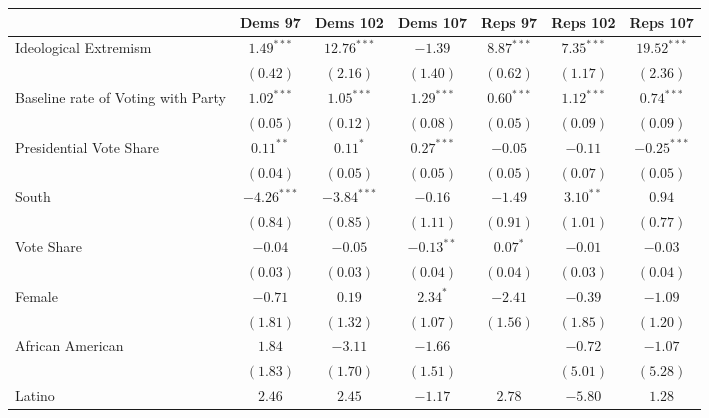 \documentclass[12pt]{article}
\begin{document}
\begin{table}
	\begin{center}
		\begin{tabular}{l c c c c c c }
			\hline
			& Dems 97 & Dems 102 & Dems 107 & Reps 97 & Reps 102 & Reps 107 \\
			\hline
			Ideological Extremism & $1.49^{***}$  & $12.76^{***}$ & $-1.39$        & $8.87^{***}$   & $7.35^{***}$   & $19.52^{***}$  \\
			& $(0.42)$      & $(2.16)$      & $(1.40)$       & $(0.62)$       & $(1.17)$       & $(2.36)$       \\
			Baseline rate of Voting with Party    & $1.02^{***}$  & $1.05^{***}$  & $1.29^{***}$   & $0.60^{***}$   & $1.12^{***}$   & $0.74^{***}$   \\
			& $(0.05)$      & $(0.12)$      & $(0.08)$       & $(0.05)$       & $(0.09)$       & $(0.09)$       \\
			Presidential Vote Share                  & $0.11^{**}$   & $0.11^{*}$    & $0.27^{***}$   & $-0.05$        & $-0.11$        & $-0.25^{***}$  \\
			& $(0.04)$      & $(0.05)$      & $(0.05)$       & $(0.05)$       & $(0.07)$       & $(0.05)$       \\
			South                     & $-4.26^{***}$ & $-3.84^{***}$ & $-0.16$        & $-1.49$        & $3.10^{**}$    & $0.94$         \\
			& $(0.84)$      & $(0.85)$      & $(1.11)$       & $(0.91)$       & $(1.01)$       & $(0.77)$       \\
			Vote Share                   & $-0.04$       & $-0.05$       & $-0.13^{**}$   & $0.07^{*}$     & $-0.01$        & $-0.03$        \\
			& $(0.03)$      & $(0.03)$      & $(0.04)$       & $(0.04)$       & $(0.03)$       & $(0.04)$       \\
			Female                    & $-0.71$       & $0.19$        & $2.34^{*}$     & $-2.41$        & $-0.39$        & $-1.09$        \\
			& $(1.81)$      & $(1.32)$      & $(1.07)$       & $(1.56)$       & $(1.85)$       & $(1.20)$       \\
			African American                      & $1.84$        & $-3.11$       & $-1.66$        &                & $-0.72$        & $-1.07$        \\
			& $(1.83)$      & $(1.70)$      & $(1.51)$       &                & $(5.01)$       & $(5.28)$       \\
			Latino                    & $2.46$        & $2.45$        & $-1.17$        & $2.78$         & $-5.80$        & $1.28$         \\

\end{tabular}
\end{center}
\end{table}
\end{document}
